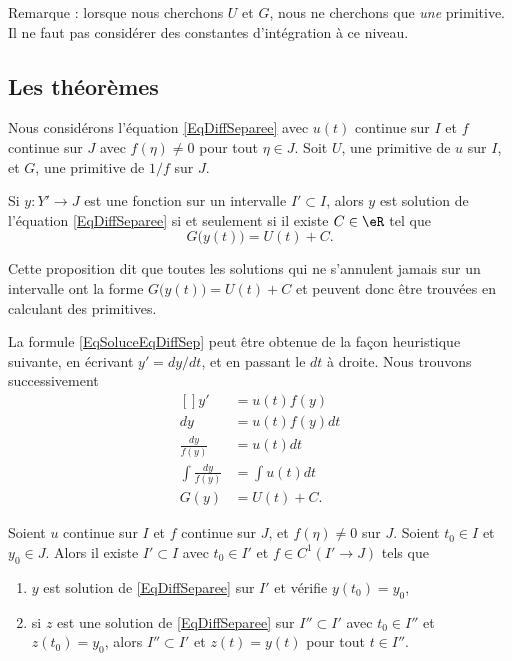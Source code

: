 Remarque : lorsque nous cherchons $U$ et $G$, nous ne cherchons que \emph{une} primitive. Il ne faut pas considérer des constantes d'intégration à ce niveau.

\subsection{Les théorèmes}

\begin{proposition}     \label{ProJLykrK}
Nous considérons l'équation \eqref{EqDiffSeparee} avec $u(t)$ continue sur $I$ et $f$ continue sur $J$ avec $f(\eta)\neq 0$ pour tout $\eta\in J$. Soit $U$, une primitive de $u$ sur $I$, et $G$, une primitive de $1/f$ sur $J$.

Si $y\colon Y'\to J$ est une fonction sur un intervalle $I'\subset I$, alors $y$ est solution de l'équation \eqref{EqDiffSeparee} si et seulement si il existe $C\in\eR$ tel que
\begin{equation}		\label{EqSoluceEqDiffSep}
	G\big( y(t) \big)=U(t)+C.
\end{equation}
\end{proposition}
Cette proposition dit que toutes les solutions qui ne s'annulent jamais sur un intervalle ont la forme $G\big( y(t) \big)=U(t)+C$ et peuvent donc être trouvées en calculant des primitives.

La formule \eqref{EqSoluceEqDiffSep} peut être obtenue de la façon heuristique suivante, en écrivant $y'=dy/dt$, et en passant le $dt$ à droite. Nous trouvons successivement
\begin{equation}
	\begin{aligned}[]
		y'&=u(t)f(y)\\
		dy&=u(t)f(y)dt\\
		\frac{ dy }{ f(y) }&=u(t)dt\\
		\int\frac{ dy }{ f(y) }&=\int u(t)dt\\
		G(y)&=U(t)+C.
	\end{aligned}
\end{equation}

\begin{proposition} \label{PropOkmXmC}
Soient $u$ continue sur $I$ et $f$ continue sur $J$, et $f(\eta)\neq 0$ sur $J$. Soient $t_0\in I$ et $y_0\in J$. Alors il existe $I'\subset I$ avec $t_0\in I'$ et $f\in C^1(I'\to J)$ tels que
\begin{enumerate}

\item
$y$ est solution de \eqref{EqDiffSeparee} sur $I'$ et vérifie $y(t_0)=y_0$,
\item
si $z$ est une solution de \eqref{EqDiffSeparee} sur $I''\subset I'$ avec $t_0\in I''$ et $z(t_0)=y_0$, alors $I''\subset I'$ et $z(t)=y(t)$ pour tout $t\in I''$.

\end{enumerate}
\end{proposition}

